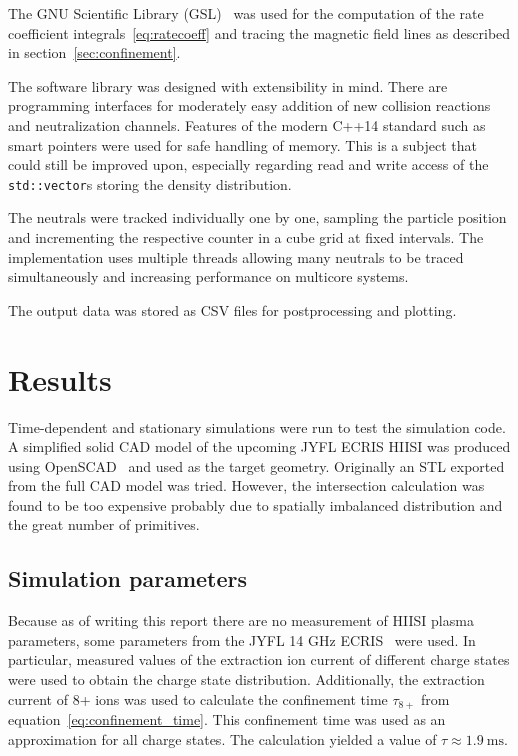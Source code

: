 \documentclass[a4paper,twoside,12pt]{article}
\begin{document}
The GNU Scientific Library (\textsc{GSL})~\cite{gsl} was used for the computation of the rate coefficient integrals~\eqref{eq:ratecoeff} and tracing the magnetic field lines as described in section~\ref{sec:confinement}.

The software library was designed with extensibility in mind. There are programming interfaces for moderately easy addition of new collision reactions and neutralization channels. Features of the modern \textsc{C++14} standard such as smart pointers were used for safe handling of memory. This is a subject that could still be improved upon, especially regarding read and write access of the \texttt{std::vector}s storing the density distribution.

The neutrals were tracked individually one by one, sampling the particle position and incrementing the respective counter in a cube grid at fixed intervals. The implementation uses multiple threads allowing many neutrals to be traced simultaneously and increasing performance on multicore systems.

The output data was stored as CSV files for postprocessing and plotting.

\section{Results}
Time-dependent and stationary simulations were run to test the simulation code. A simplified solid CAD model of the upcoming JYFL ECRIS HIISI was produced using OpenSCAD~\cite{openscad} and used as the target geometry. Originally an STL exported from the full CAD model was tried. However, the intersection calculation was found to be too expensive probably due to spatially imbalanced distribution and the great number of primitives.

\subsection{Simulation parameters}
Because as of writing this report there are no measurement of HIISI plasma parameters, some parameters from the JYFL 14 GHz ECRIS~\cite{jyfl:ecris14} were used. In particular, measured values of the extraction ion current of different charge states were used to obtain the charge state distribution. Additionally, the extraction current of 8+ ions was used to calculate the confinement time $\tau_{8+}$ from equation~\eqref{eq:confinement_time}. This confinement time was used as an approximation for all charge states. The calculation yielded a value of $\tau \approx \SI{1.9}{\milli\second}$.
\end{document}
